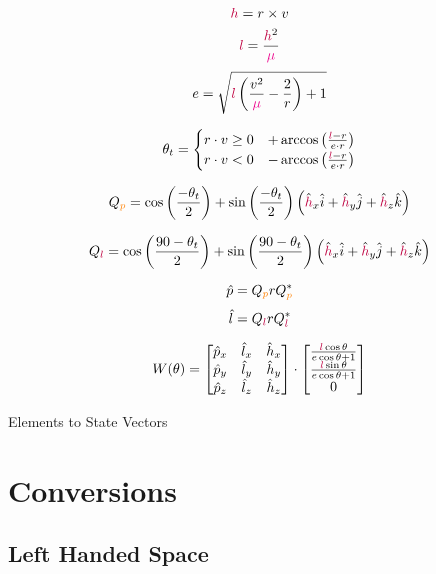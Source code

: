		\newcommand{\rv}{r}
		\newcommand{\vv}{v}
	
		$$\hv = \rv \times \vv$$
		$$\textcolor{purple}{l} = \frac{\textcolor{purple}{h}^2}{\textcolor{magenta}{\mu}}$$
		$$\e = \sqrt{\latus\left(\frac{\vv^2}{\stg}-\frac{2}{\rv}\right)+1}$$
		
		\[\true = \begin{cases} 
      		\rv \cdot \vv \geq 0    &+\arccos{\left( \frac{\latus - \rv}{\e \cdot \rv} \right)} \\
      		\rv \cdot \vv < 0       &-\arccos{\left( \frac{\latus - \rv}{\e \cdot \rv} \right)}
   		\end{cases} \]
   		
   		$$Q_{\textcolor{orange}{p}} = \cos{\left(\frac{-\textcolor{black}{\theta_t}}{2}\right)} + \sin{\left(\frac{-\textcolor{black}{\theta_t}}{2}\right)\left(\hat{\textcolor{purple}{h}}_x\hat{\textcolor{black}{i}}+ \hat{\textcolor{purple}{h}}_y\hat{\textcolor{black}{j}}+ \hat{\textcolor{purple}{h}}_z\hat{\textcolor{black}{k}}\right)}$$
   		
   		$$Q_{\textcolor{purple}{l}} = \cos{\left(\frac{90-\textcolor{black}{\theta_t}}{2}\right)} + \sin{\left(\frac{90-\textcolor{black}{\theta_t}}{2}\right)\left(\hat{\textcolor{purple}{h}}_x\hat{\textcolor{black}{i}}+ \hat{\textcolor{purple}{h}}_y\hat{\textcolor{black}{j}}+ \hat{\textcolor{purple}{h}}_z\hat{\textcolor{black}{k}}\right)}$$
   		
   		$$\hat{p} = Q_{\peri } \rv Q_{\peri }^*$$
   		$$\hat{l} = Q_{\latus} \rv Q_{\latus}^*$$
   		
   		$$W(\theta) =
   		\begin{bmatrix}
   		\hat{p}_x & \hat{l}_x & \hat{h}_x\\
   		\hat{p}_y & \hat{l}_y & \hat{h}_y\\
   		\hat{p}_z & \hat{l}_z & \hat{h}_z
   		\end{bmatrix} \cdot
   		\begin{bmatrix}
   		\frac{\textcolor{purple}{l}\cos{\theta}}{\textcolor{black}{e}\cos{\theta}+1} \\
   		\frac{\textcolor{purple}{l}\sin{\theta}}{\textcolor{black}{e}\cos{\theta}+1} \\
   		0
   		\end{bmatrix}
   		$$
   		
   		Elements to State Vectors
		
		

\section{Conversions}
	\subsection{Left Handed Space}

